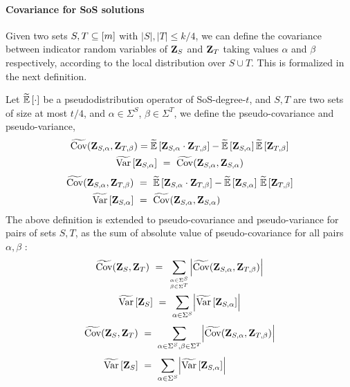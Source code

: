 \paragraph{Covariance for SoS solutions}
Given two sets $S,T \subseteq [m]$ with $|S|,|T|\leq k/4$, we can define the covariance between indicator random variables of ${ \mathbf{Z} }_S$ and ${ \mathbf{Z} }_T$ taking values $\alpha$ and $\beta$ respectively, according to the local distribution over $S \cup T$. This is formalized in the next definition.
\begin{definition}
Let $\tildeEx{\cdot}$ be a pseudodistribution operator of SoS-degree-$t$, and $S,T$ are two sets of
size at most $t/4$, and $\alpha\in \Sigma^S$, $\beta\in \Sigma^T$, we define the pseudo-covariance and
pseudo-variance,
%
\ifnum{}
\small
\begin{gather*}
\tildecov(\zee_{S,\alpha},\zee_{T,\beta}) 
= \tildeEx{ \zee_{S,\alpha} \cdot \zee_{T,\beta} } - \tildeEx{\zee_{S,\alpha}} \tildeEx{\zee_{T,\beta}} \\	
\tildeVar{\zee_{S,\alpha}} ~=~ \tildecov(\zee_{S,\alpha},\zee_{S,\alpha})
\end{gather*}
\normalsize
\else
\begin{align*}
\tildecov(\zee_{S,\alpha},\zee_{T,\beta}) 
~&=~ \tildeEx{ \zee_{S,\alpha} \cdot \zee_{T,\beta} } - \tildeEx{\zee_{S,\alpha}} \,\tildeEx{\zee_{T,\beta}}\\ 		
\tildeVar{\zee_{S,\alpha}} ~&=~ \tildecov(\zee_{S,\alpha},\zee_{S,\alpha})
\end{align*}
\fi
%
The above definition is extended to pseudo-covariance and pseudo-variance for pairs of sets $S,T$, 
as the sum of absolute value of pseudo-covariance for all pairs $\alpha,\beta$ :
%
\ifnum{}
\begin{gather*}
\tildecov(\zee_S,\zee_T) 
~=~ \sum_{\alpha\in \Sigma^S \atop \beta\in \Sigma^T} \abs*{ \tildecov(\zee_{S,\alpha},\zee_{T,\beta}) } \\
\tildeVar{\zee_S} ~=~ \sum_{\alpha\in \Sigma^S} \abs*{ \tildeVar{\zee_{S,\alpha} } }
\end{gather*}
\else
\begin{align*}
\tildecov(\zee_S,\zee_T) 
~&=~ \sum_{\alpha\in \Sigma^S, \beta\in \Sigma^T} \abs*{ \tildecov(\zee_{S,\alpha},\zee_{T,\beta}) }\\[3pt]
\tildeVar{\zee_S} ~&=~ \sum_{\alpha\in \Sigma^S} \abs*{ \tildeVar{\zee_{S,\alpha} } }
\end{align*}
\fi
%
\end{definition}

